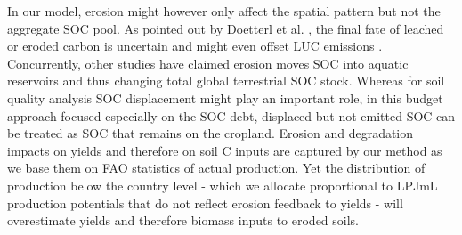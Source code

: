 \documentclass[gc, manuscript]{copernicus}
\begin{document}
In our model, erosion might however only affect the spatial pattern but not the aggregate SOC pool. As pointed out by Doetterl et al. \citeyearpar{doetterl_erosion_2016}, the final fate of leached or eroded carbon is uncertain and might even offset LUC emissions \citep{wang_human-induced_2017}. Concurrently, other studies have claimed erosion moves SOC into aquatic reservoirs \citep{zhang_simulating_2020} and thus changing total global terrestrial SOC stock.
Whereas for soil quality analysis SOC displacement might play an important role, in this budget approach focused especially on the SOC debt, displaced but not emitted SOC can be treated as SOC that remains on the cropland. Erosion and degradation impacts on yields and therefore on soil C inputs are captured by our method as we base them on FAO statistics of actual production. Yet the distribution of production below the country level - which we allocate proportional to LPJmL production potentials that do not reflect erosion feedback to yields - will overestimate yields and therefore biomass inputs to eroded soils.
\end{document}
